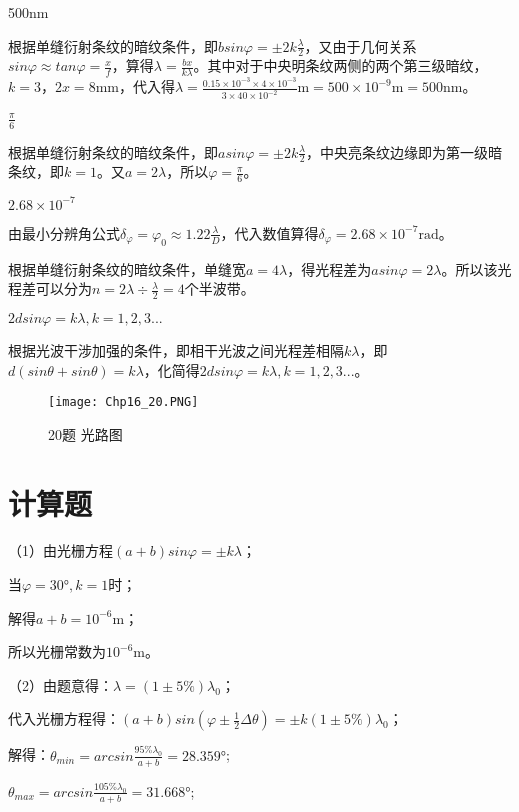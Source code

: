 \exercise 500nm

\solve
根据单缝衍射条纹的暗纹条件，即$bsin\varphi=\pm2k\frac{\lambda}{2}$，又由于几何关系$sin\varphi\approx tan\varphi=\frac{x}{f}$，算得$\lambda=\frac{bx}{k\lambda}$。其中对于中央明条纹两侧的两个第三级暗纹，$k=3$，$2x=8\mathrm{mm}$，代入得$\lambda=\frac{0.15\times10^{-3}\times4\times10^{-3}}{3\times40\times10^{-2}}\mathrm{m}=500\times10^{-9}\mathrm{m}=500\mathrm{nm}$。

\exercise $\frac{\pi}{6}$

\solve
根据单缝衍射条纹的暗纹条件，即$asin\varphi=\pm2k\frac{\lambda}{2}$，中央亮条纹边缘即为第一级暗条纹，即$k=1$。又$a=2\lambda$，所以$\varphi=\frac{\pi}{6}$。

\exercise $2.68\times10^{-7}$

\solve
由最小分辨角公式$\delta_\varphi=\varphi_0\approx1.22\frac{\lambda}{D}$，代入数值算得$\delta_\varphi=2.68\times10^{-7}\mathrm{rad}$。


\solve
根据单缝衍射条纹的暗纹条件，单缝宽$a=4\lambda$，得光程差为$asin\varphi=2\lambda$。所以该光程差可以分为$n=2\lambda\div\frac{\lambda}{2}=4$个半波带。

\exercise $2dsin\varphi=k\lambda,k=1,2,3...$

\solve
根据光波干涉加强的条件，即相干光波之间光程差相隔$k\lambda$，即$d(sin\theta+sin\theta)=k\lambda$，化简得$2dsin\varphi=k\lambda,k=1,2,3...$。
\begin{figure}[!h]
	\centering
	\texttt{[image: Chp16\_20.PNG]}
	\caption{20题 光路图}
\end{figure}
\section{计算题}
\exercise

\solve
（1）由光栅方程$(a+b)sin\varphi=\pm k\lambda$；

当$\varphi=30°,k=1$时；

解得$a+b=10^{-6}\mathrm{m}$；

所以光栅常数为$10^{-6}\mathrm{m}$。

（2）由题意得：$\lambda=(1\pm5\% ) \lambda_0$；

代入光栅方程得：$(a+b)sin(\varphi\pm\frac{1}{2}\Delta\theta)=\pm k(1\pm5\%)\lambda_0$；

解得：$\theta_{min}=arcsin\frac{95\%\lambda_0}{a+b}=28.359°$;

$\theta_{max}=arcsin\frac{105\%\lambda_0}{a+b}=31.668°$;

